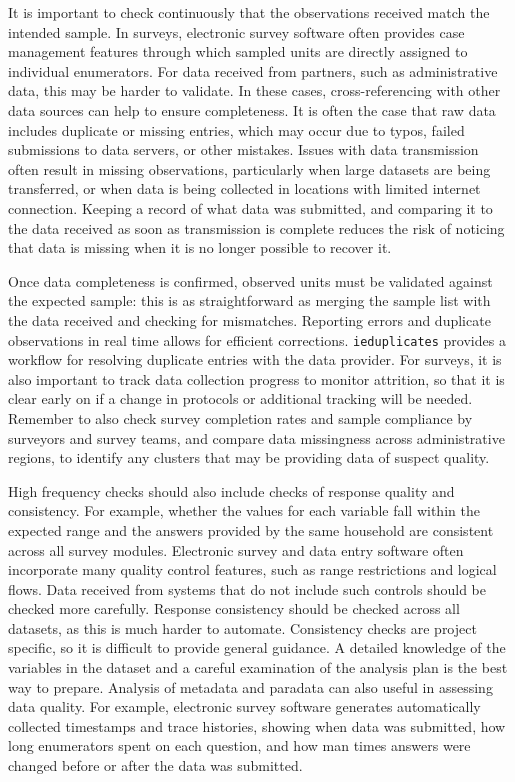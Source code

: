 It is important to check continuously that the observations received match the intended sample.
In surveys, electronic survey software often provides case management features
through which sampled units are directly assigned to individual enumerators.
For data received from partners, such as administrative data,
this may be harder to validate.
In these cases, cross-referencing with other data sources can help to ensure completeness.
It is often the case that raw data includes duplicate or missing entries,
which may occur due to typos, failed submissions to data servers,
or other mistakes.
Issues with data transmission often result in missing observations,
particularly when large datasets are being transferred,
or when data is being collected in locations with limited internet connection.
Keeping a record of what data was submitted,
and comparing it to the data received as soon as transmission is complete
reduces the risk of noticing that data is missing when it is no longer possible to recover it.

Once data completeness is confirmed,
observed units must be validated against the expected sample:
this is as straightforward as merging the sample list
with the data received and checking for mismatches.
Reporting errors and duplicate observations in real time allows for efficient corrections.
\texttt{ieduplicates}
provides a workflow for resolving duplicate entries with the data provider.
For surveys, it is also important to track data collection progress to  monitor attrition,
so that it is clear early on if a change in protocols or additional tracking will be needed.
Remember to also check survey completion rates
and sample compliance by surveyors and survey teams,
and compare data missingness across administrative regions,
to identify any clusters that may be providing data of suspect quality.

High frequency checks should also include checks of response quality and consistency.
For example, whether the values for each variable fall within the expected range and
the answers provided by the same household are consistent across all survey modules.
Electronic survey and data entry software often incorporate many quality control features,
such as range restrictions and logical flows.
Data received from systems that do not include such controls should be checked more carefully.
Response consistency should be checked across all datasets, as this is much harder to automate.
Consistency checks are project specific, so it is difficult to provide general guidance.
A detailed knowledge of the variables in the dataset and a careful examination of the analysis plan
is the best way to prepare.
Analysis of metadata and paradata can also useful in assessing data quality.
For example, electronic survey software generates
automatically collected timestamps and trace histories,
showing when data was submitted, how long enumerators spent on each question,
and how man times answers were changed before or after the data was submitted.

